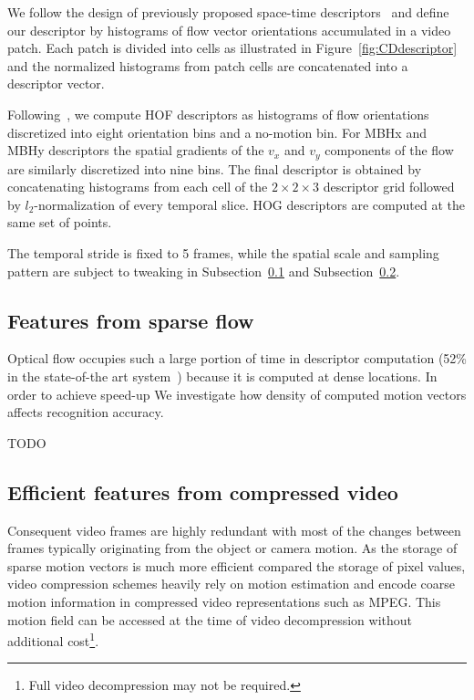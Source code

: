 \documentclass[10pt,twocolumn,letterpaper]{article}
\begin{document}
We follow the design of previously proposed space-time
descriptors~\cite{Laptev08,Wang12} and define our descriptor by
histograms of flow vector orientations accumulated in a video patch. Each patch is divided into cells as illustrated in
Figure~\ref{fig:CDdescriptor} and the normalized histograms from
patch cells are concatenated into a descriptor vector.

Following~\cite{Wang12}, we compute HOF descriptors as
histograms of flow orientations discretized into eight orientation bins and a no-motion bin. For MBHx and MBHy descriptors the spatial
gradients of the $v_x$ and $v_y$ components of the flow are
similarly discretized into nine bins. 
The final descriptor is obtained by concatenating histograms
from each cell of the $2\times2\times3$ descriptor grid followed
by $l_2$-normalization of every temporal slice. HOG descriptors
are computed at the same set of points.


The temporal stride is fixed to 5 frames, while the spatial scale and sampling pattern are subject to tweaking in Subsection~\ref{subsec:sparse_opt_flow} and Subsection~\ref{subsec:sparse_mv_flow}.

\subsection{Features from sparse flow}
\label{subsec:sparse_opt_flow}
Optical flow occupies such a large portion of time in descriptor computation (52\% in the state-of-the art system~\cite{Wang12}) because it is computed at dense locations. In order to achieve speed-up We investigate how density of computed motion vectors affects recognition accuracy.

{\Large \color{red} TODO}

\subsection{Efficient features from compressed video}
\label{subsec:sparse_mv_flow}
Consequent video frames are highly redundant with most of the changes between frames typically originating from the object or camera motion. As the storage of sparse motion vectors is much more efficient compared the storage of pixel values, video compression schemes heavily rely on motion estimation and encode coarse motion information in compressed video representations such as MPEG. This motion field can be accessed at the time of video decompression without additional cost\footnote{Full video decompression may not be required.}.
\end{document}
